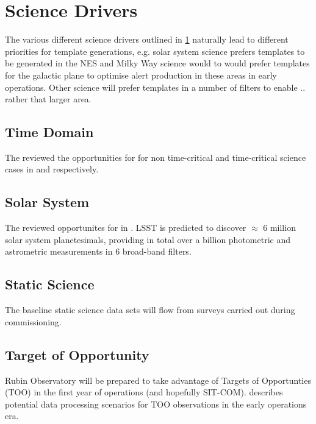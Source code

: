 \section{Science Drivers} \label{sec:science}

The various different science drivers outlined in \ref{sec:science} naturally lead to different priorities for template generations, e.g. solar system science prefers templates to be generated in the NES and Milky Way science would to would prefer templates for the galactic plane to optimise alert production in these areas in early operations. Other science will prefer templates in a number of filters to enable .. rather that larger area. 

\subsection{Time Domain}

The \tvssc reviewed the opportunities for \es for non time-critical and  time-critical science cases in \cite{Hambleton_2020} and \cite{Street_2020} respectively. 

\subsection{Solar System}

The \sssc reviewed opportunites for \es in . 
LSST is predicted to discover $\approx$ 6 million solar system planetesimals, providing in total over a billion photometric and astrometric measurements in 6 broad-band filters. 

\subsection{Static Science}
The baseline static science data sets will flow from \sv surveys carried out during commissioning. 

\subsection{Target of Opportunity}
Rubin Observatory will be prepared to take advantage of Targets of Opportunties (TOO) in the first year of operations (and hopefully SIT-COM). 
 describes potential data processing scenarios for TOO observations in the early operations era.